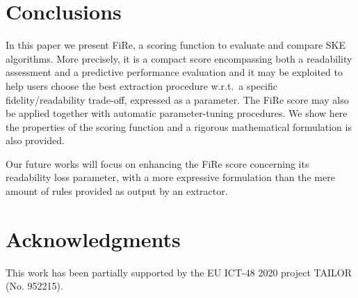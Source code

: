 \documentclass{article}
\newcommand{\fire}{FiRe}
\begin{document}
\section{Conclusions}\label{sec:conclusions}

In this paper we present \fire{}, a scoring function to evaluate and compare SKE algorithms.
%
More precisely, it is a compact score encompassing both a readability assessment and a predictive performance evaluation and it may be exploited to help users choose the best extraction procedure w.r.t.\ a specific fidelity/readability trade-off, expressed as a parameter.
%
The \fire{} score may also be applied together with automatic parameter-tuning procedures.
%
We show here the properties of the scoring function and a rigorous mathematical formulation is also provided.

Our future works will focus on enhancing the \fire{} score concerning its readability loss parameter, with a more expressive formulation than the mere amount of rules provided as output by an extractor.

\section*{Acknowledgments}

This work has been partially supported by the EU ICT-48 2020 project TAILOR (No. 952215).




\end{document}
